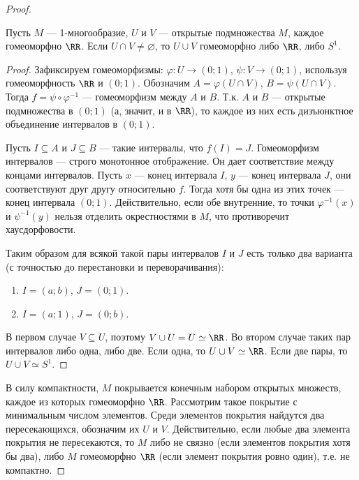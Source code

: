 \documentclass[12pt,a4paper]{article}
\begin{document}
    \begin{proof}
        \begin{thlemma}
            Пусть $M$ --- 1-многообразие, $U$ и $V$ --- открытые подмножества $M$, каждое гомеоморфно $\RR$. Если $U \cap V \neq \varnothing$, то $U \cup V$ гомеоморфно либо $\RR$, либо $S^1$.
        \end{thlemma}

        \begin{proof}
            Зафиксируем гомеоморфизмы: $\varphi: U \to (0; 1)$, $\psi: V \to (0; 1)$, используя гомеоморфность $\RR$ и $(0; 1)$. Обозначим $A = \varphi(U \cap V)$, $B = \psi(U \cap V)$. Тогда $f = \psi \circ \varphi^{-1}$ --- гомеоморфизм между $A$ и $B$. Т.к. $A$ и $B$ --- открытые подмножества в $(0; 1)$ (а, значит, и в $\RR$), то каждое из них есть дизъюнктное объединение интервалов в $(0; 1)$.
            
            Пусть $I \subseteq A$ и $J \subseteq B$ ---  такие интервалы, что $f(I) = J$. Гомеоморфизм интервалов --- строго монотонное отображение. Он дает соответствие между концами интервалов. Пусть $x$ --- конец интервала $I$, $y$ --- конец интервала $J$, они соответствуют друг другу относительно $f$. Тогда хотя бы одна из этих точек --- конец интервала $(0; 1)$. Действительно, если обе внутренние, то точки $\varphi^{-1}(x)$ и $\psi^{-1}(y)$ нельзя отделить окрестностями в $M$, что противоречит хаусдорфовости.

            Таким образом для всякой такой пары интервалов $I$ и $J$ есть только два варианта (с точностью до перестановки и
            переворачивания):
            \begin{enumerate}
                \item $I = (a; b)$, $J = (0; 1)$.
                \item $I = (a; 1)$, $J = (0; b)$.
            \end{enumerate}
            В первом случае $V \subseteq U$, поэтому $V \cup U = U \simeq \RR$. Во втором случае таких пар интервалов либо одна, либо две. Если одна, то $U \cup V \simeq \RR$. Если две пары, то $U \cup V \simeq S^1$.
        \end{proof}

        В силу компактности, $M$ покрывается конечным набором открытых множеств, каждое из которых гомеоморфно $\RR$. Рассмотрим такое покрытие с минимальным числом элементов. Среди элементов покрытия найдутся два пересекающихся, обозначим их $U$ и $V$. Действительно, если любые два элемента покрытия не пересекаются, то $M$ либо не связно (если элементов покрытия хотя бы два), либо $M$ гомеоморфно $\RR$ (если элемент покрытия ровно один), т.е. не компактно.
        

\end{proof}
\end{document}
